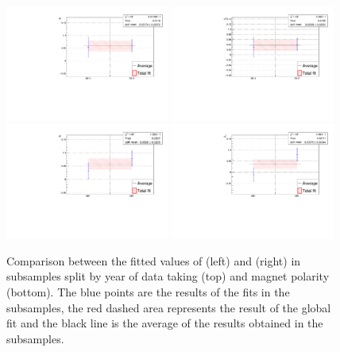 \begin{figure}[tbp]
    \centering
    \includegraphics[width=0.48\textwidth]{09TimeFit/figs/Sf_splits_Year.pdf}
    \includegraphics[width=0.48\textwidth]{09TimeFit/figs/Sfbar_splits_Year.pdf}\\
    \includegraphics[width=0.48\textwidth]{09TimeFit/figs/Sf_splits_Polarity.pdf}
    \includegraphics[width=0.48\textwidth]{09TimeFit/figs/Sfbar_splits_Polarity.pdf}
    \caption{Comparison between the fitted values of \Sf (left) and \Sfbar (right) in subsamples split by year of data taking (top) and magnet polarity (bottom).
    The blue points are the results of the fits in the subsamples, the red dashed area represents the result of the global fit and the black line is the average of the results obtained in the subsamples.}
    \label{fig:splitByDataTaking}
\end{figure}

